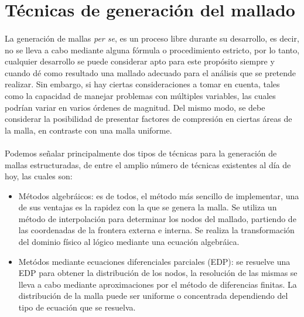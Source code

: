 \documentclass[letterpaper, openright, 12pt]{book}
\begin{document}
    \section{Técnicas de generación del mallado}
    \paragraph*{}
    La generación de mallas \textit{per se}, es un proceso libre durante su
    desarrollo, es decir, no se lleva a cabo mediante alguna fórmula o
    procedimiento estricto, por lo tanto, cualquier desarrollo se puede
    considerar apto para este propósito siempre y cuando dé como resultado
    una mallado adecuado para el análisis que se pretende realizar. Sin
    embargo, si hay ciertas consideraciones a tomar en cuenta, tales como la
    capacidad de manejar problemas con múltiples variables, las cuales
    podrían variar en varios órdenes de magnitud. Del mismo modo, se debe
    considerar la posibilidad de presentar factores de compresión en ciertas
    áreas de la malla, en contraste con una malla uniforme.

    \paragraph*{}
    Podemos señalar principalmente dos tipos de técnicas para la generación
    de mallas estructuradas, de entre el amplio número de técnicas existentes
    al día de hoy, las cuales son:
    \begin{itemize}
        \item Métodos algebráicos: es de todos, el método más sencillo de
            implementar, una de sus ventajas es la rapidez con la que se
            genera la malla. Se utiliza un método de interpolación para
            determinar los nodos del mallado, partiendo de las coordenadas
            de la frontera externa e interna. Se realiza la transformación
            del dominio físico al lógico mediante una ecuación algebráica.
        \item Metódos mediante  ecuaciones diferenciales parciales (EDP): se
            resuelve una EDP para obtener la distribución de los nodos,
            la resolución de las mismas se lleva a cabo mediante
            aproximaciones por el método de diferencias finitas. La
            distribución de la malla puede ser uniforme o concentrada
            dependiendo del tipo de ecuación que se resuelva.
    \end{itemize}
\end{document}
